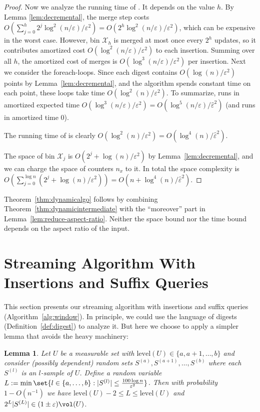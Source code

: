 \documentclass[a4paper, 11pt]{article}
\newtheorem{lemma}[theorem]{Lemma}
\newcommand{\level}{\mathrm{level}}
\newcommand{\eps}{\varepsilon}
\newcommand{\class}[1]{\mathcal{#1}}
\begin{document}
\begin{proof}
    Now we analyze the running time of \ins. It depends on the value $h$. By Lemma \ref{lem:decremental}, the merge step costs $O \left( \sum_{j = 0}^h 2^j \log^2(n/\eps) / \eps^2 \right) = O \left( 2^h \log^2(n/\eps) / \eps^2 \right)$, which can be expensive in the worst case. However, bin $\class{X}_h$ is merged at most once every $2^h$ updates, so it contributes amortized cost $O(\log^2(n/\eps) / \eps^2)$ to each insertion. Summing over all $h$, the amortized cost of merges is $O(\log^3(n/\eps) / \eps^2)$ per insertion.
    Next we consider the foreach-loops. Since each digest contains $O(\log(n) / \eps^2)$ points by Lemma~\ref{lem:decremental}, and the algorithm spends constant time on each point, these loops take time $O(\log^2(n) / \eps^2)$.
    To summarize, \ins runs in amortized expected time $O(\log^3(n/\eps) / \eps^2) = O(\log^5(n/\eps) / \hat \eps^2)$ (and \del runs in amortized time 0).
    
    The running time of \est is clearly $O(\log^2(n) / \eps^2) = O(\log^4(n)/\hat \eps^2)$.
    
    The space of bin $\class{X}_j$ is $O(2^j + \log(n) / \eps^2)$ by Lemma~\ref{lem:decremental}, and we can charge the space of counters $n_x$ to it. In total the space complexity is $O\left( \sum_{j=0}^{\log n} (2^j + \log(n) / \eps^2) \right) = O(n + \log^4(n) / \hat \eps^2)$.
\end{proof}

Theorem~\ref{thm:dynamicalgo} follows by combining Theorem~\ref{thm:dynamicintermediate} with the ``moreover'' part in Lemma~\ref{lem:reduce-aspect-ratio}. Neither the space bound nor the time bound depends on the aspect ratio of the input.

\section{Streaming Algorithm With Insertions and Suffix Queries}
\label{sec:window}

This section presents our streaming algorithm with insertions and suffix queries (Algorithm~\ref{alg:window}).
In principle, we could use the language of digests (Definition~\ref{def:digest}) to analyze it. But here we choose to apply a simpler lemma that avoids the heavy machinery:
\begin{lemma}
    \label{lem:select-sample}
    Let $U$ be a measurable set with $\level(U) \in \{a,a+1,\ldots,b\}$ and consider (possibly dependent) random sets $S^{(a)}, S^{(a+1)}, \dots, S^{(b)}$ where each $S^{(l)}$ is an $l$-sample of $U$. Define a random variable $L := \min \set{l \in \{a,\ldots,b\} : |S^{(l)}| \leq \frac{100 \log n}{\eps^2}}$. Then with probability $1 - O(n^{-1})$ we have $\level(U)-2 \leq L \leq \level(U)$ and $2^L |S^{(L)}| \in (1 \pm \eps) \vol(U)$.
\end{lemma}
\end{document}
